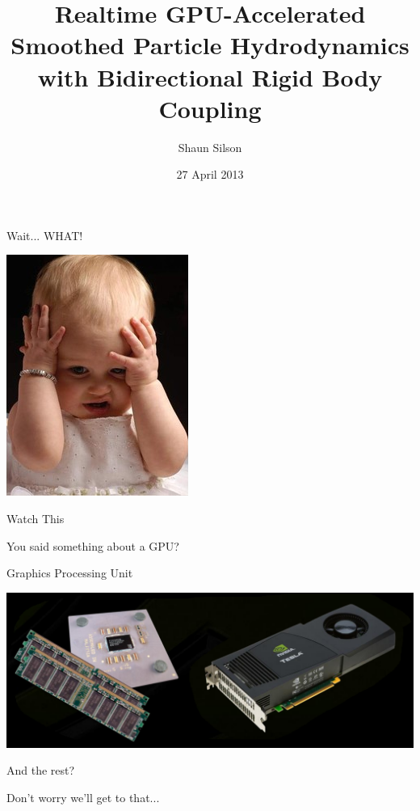 \documentclass[12pt]{beamer}
\title[]{Realtime GPU-Accelerated Smoothed Particle Hydrodynamics with Bidirectional Rigid Body Coupling}
\author{Shaun Silson}
\date{27 April 2013}
\institute[UCT]{University of Cape Town}
\begin{document}
\titlepage

\begin{frame}{Wait... WHAT!}


\begin{center}

\includegraphics[scale=0.5]{confused-girl} \pause

Watch This 

\end{center}

\end{frame}


\begin{frame}{You said something about a GPU?}
\pause

Graphics Processing Unit

\vspace{12pt}

\includegraphics[scale=0.4]{CPU-GPU}

\end{frame}


\begin{frame}{And the rest?}
\pause

\begin{center}
Don't worry we'll get to that...
\end{center}

\end{frame}
\end{document}
